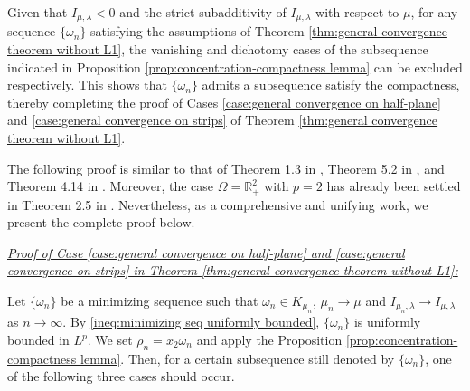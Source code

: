 \documentclass[11pt,letterpaper]{amsart}
\theoremstyle{definition}
\theoremstyle{remark}
\numberwithin{equation}{section}
\begin{document}
Given that $I_{\mu,\lambda}<0$ and the strict subadditivity of $I_{\mu,\lambda}$ with respect to $\mu$, for any sequence $\{\omega_n\}$ satisfying the assumptions of Theorem \ref{thm:general convergence theorem without L1}, the vanishing and dichotomy cases of the subsequence indicated in Proposition \ref{prop:concentration-compactness lemma} can be excluded respectively. This shows that $\{\omega_n\}$ admits a subsequence satisfy the compactness, thereby completing the proof of Cases \ref{case:general convergence on half-plane} and \ref{case:general convergence on strips} of Theorem \ref{thm:general convergence theorem without L1}.


The following proof is similar to that of Theorem 1.3 in \cite{abe2022stability}, Theorem 5.2 in \cite{abe2025existence}, and Theorem 4.14 in \cite{Dong2026StabilityOV}. Moreover, the case $\Omega=\mathbb{R}^2_+$ with $p=2$ has already been settled in Theorem 2.5 in \cite{Abe2025StabilityOL}. Nevertheless, as a comprehensive and unifying work, we present the complete proof below.

\hspace*{\fill} 

\noindent\underline{\textit{Proof of Case \ref{case:general convergence on half-plane} and \ref{case:general convergence on strips} in Theorem \ref{thm:general convergence theorem without L1}:}}

Let $\{ \omega_n \}$ be a minimizing sequence such that $\omega_n\in K_{\mu_n}$, $\mu_n \to \mu$ and $I_{\mu_n,\lambda} \to I_{\mu,\lambda}$ as $n\to \infty$. By \eqref{ineq:minimizing seq uniformly bounded}, $\{\omega_n\}$ is uniformly bounded in $L^p$. We set $\rho_n = x_2\omega_n$ and apply the Proposition \ref{prop:concentration-compactness lemma}. Then, for
a certain subsequence still denoted by $\{\omega_n\}$, one of the following three cases should occur.
\end{document}
